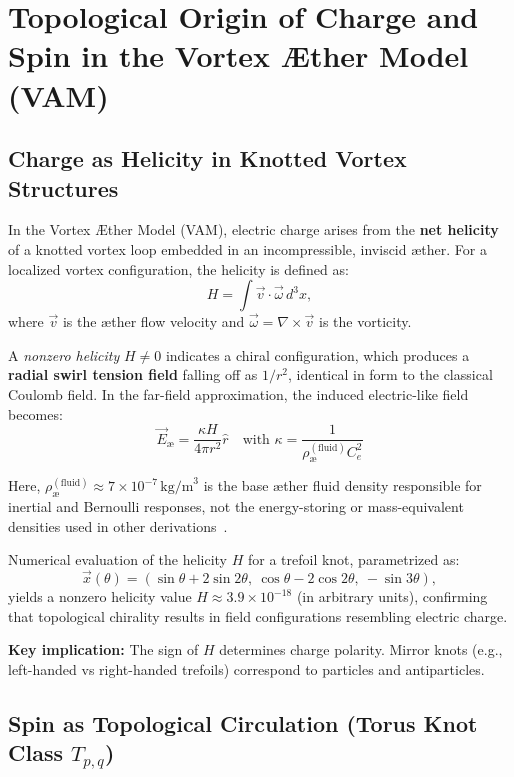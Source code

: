 \section{Topological Origin of Charge and Spin in the Vortex \AE ther Model (VAM)}

\subsection{Charge as Helicity in Knotted Vortex Structures}

In the Vortex \AE ther Model (VAM), electric charge arises from the \textbf{net helicity} of a knotted vortex loop embedded in an incompressible, inviscid \ae ther. For a localized vortex configuration, the helicity is defined as:
\[
H = \int \vec{v} \cdot \vec{\omega} \, d^3x,
\]
where \( \vec{v} \) is the \ae ther flow velocity and \( \vec{\omega} = \nabla \times \vec{v} \) is the vorticity.

A \emph{nonzero helicity} \( H \neq 0 \) indicates a chiral configuration, which produces a \textbf{radial swirl tension field} falling off as \( 1/r^2 \), identical in form to the classical Coulomb field. In the far-field approximation, the induced electric-like field becomes:
\[
\vec{E}_\text{\ae} = \frac{\kappa H}{4\pi r^2} \hat{r}
\quad \text{with } \kappa = \frac{1}{\rho_\text{\ae}^{(\text{fluid})} C_e^2}
\]

Here, \( \rho_\text{\ae}^{(\text{fluid})} \approx 7 \times 10^{-7} \, \text{kg/m}^3 \) is the base æther fluid density responsible for inertial and Bernoulli responses, not the energy-storing or mass-equivalent densities used in other derivations~\cite{iskandarani2025vam4, iskandarani2025vam-master}.


Numerical evaluation of the helicity \( H \) for a trefoil knot, parametrized as:
\[
\vec{x}(\theta) = \left( \sin \theta + 2 \sin 2\theta,\ \cos \theta - 2 \cos 2\theta,\ -\sin 3\theta \right),
\]
yields a nonzero helicity value \( H \approx 3.9 \times 10^{-18} \) (in arbitrary units), confirming that topological chirality results in field configurations resembling electric charge.

\textbf{Key implication:} The sign of \( H \) determines charge polarity. Mirror knots (e.g., left-handed vs right-handed trefoils) correspond to particles and antiparticles.

\subsection{Spin as Topological Circulation (Torus Knot Class \( T_{p,q} \))}

